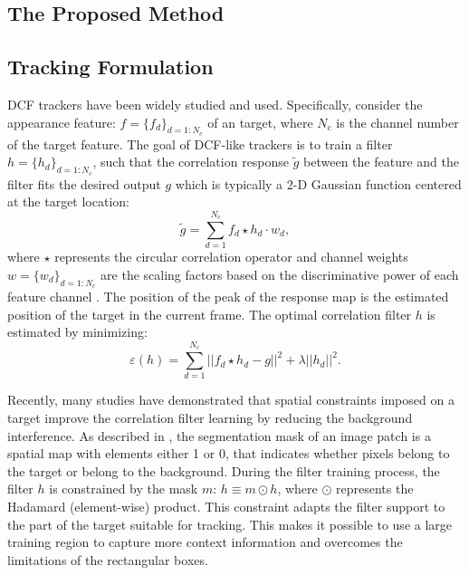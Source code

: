 \documentclass[review]{elsarticle}
\begin{document}
\begin{CJK*}{UTF8}{gbsn}
\section{The Proposed Method}

\subsection{Tracking Formulation}
DCF trackers \cite{Bolme2010VisualOT, Danelljan2014AccurateSE, Henriques2015HighSpeedTW, Li2014ASA} have been widely studied and used. Specifically, consider the appearance feature: $f=\{f_d\}_{d=1:N_c}$ of an target, where $N_c$ is the channel number of the target feature. The goal of DCF-like trackers is to train a filter $h=\{h_d\}_{d=1:N_c}$, such that the correlation response $\tilde{g}$ between the feature and the filter fits the desired output $g$ which is typically a 2-D Gaussian function centered at the target location: 
\begin{equation} \label{eq:dcf}
\tilde{g}=\sum_{d=1}^{N_c}f_d \star h_d \cdot w_d,
\end{equation}
where $\star$ represents the circular correlation operator and channel weights $w = \{w_d\}_{d=1:N_c}$ are the scaling factors based on the discriminative power of each feature channel \cite{Lukezic2017DiscriminativeCF}.
The position of the peak of the response map is the estimated position of the target in the current frame.
The optimal correlation filter $h$ is estimated by minimizing:
\begin{equation}
\varepsilon(h) = \sum_{d=1}^{N_c}||f_d \star h_d - g||^2+\lambda||h_d||^2.
\end{equation}

Recently, many studies \cite{Danelljan2015LearningSR, Lukezic2017DiscriminativeCF, Galoogahi2017LearningBC, Xu2018LearningAD, Feng2018LearningSR} have demonstrated that spatial constraints imposed on a target improve the correlation filter learning by reducing the background interference. As described in \cite{Lukezic2017DiscriminativeCF}, the segmentation mask of an image patch is a spatial map with elements either 1 or 0, that indicates whether pixels belong to the target or belong to the background. During the filter training process, the filter $h$ is constrained by the mask $m$: $h \equiv m \odot h$, where $\odot$ represents the Hadamard (element-wise) product. This constraint adapts the filter support to the part of the target suitable for tracking. This makes it possible to use a large training region to capture more context information and overcomes the limitations of the rectangular boxes.


\end{CJK*}
\end{document}
